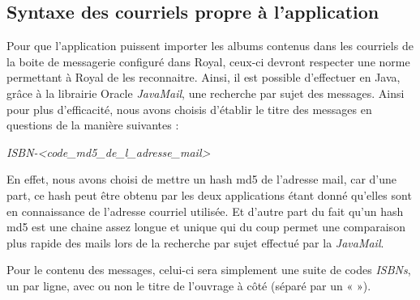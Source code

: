 \subsection{Syntaxe des courriels propre à l'application}

Pour que l'application puissent importer les albums contenus dans les courriels de la boite de messagerie configuré dans Royal,
	  ceux-ci devront respecter une norme permettant à Royal de les reconnaitre.
Ainsi, il est possible d'effectuer en Java, grâce à la librairie Oracle \emph{JavaMail},
	une recherche par sujet des messages.
	Ainsi pour plus d'efficacité, nous avons choisis d'établir le titre des messages en questions de la manière suivantes :

\emph{ISBN-\textless code\_md5\_de\_l\_adresse\_mail\textgreater}

En effet, nous avons choisi de mettre un hash md5 de l'adresse mail,
	car d'une part, ce hash peut être obtenu par les deux applications étant donné qu'elles sont en connaissance de l'adresse courriel utilisée.
	Et d'autre part du fait qu'un hash md5 est une chaine assez longue et unique qui du coup permet une comparaison plus rapide des mails lors de la recherche par sujet effectué par la \emph{JavaMail}.

Pour le contenu des messages, celui-ci sera simplement une suite de codes \emph{ISBNs},
	  un par ligne, avec ou non le titre de l'ouvrage à côté (séparé par un « \textpipe »).


